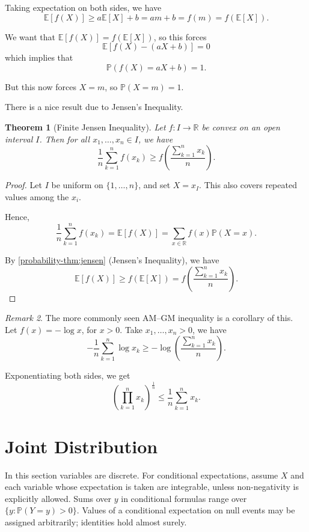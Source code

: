 \documentclass[11pt]{article}
\numberwithin{equation}{section}
\newtheorem{theorem}{Theorem}[section]
\theoremstyle{definition}
\theoremstyle{remark}
\newtheorem{remark}[theorem]{Remark}
\newcommand{\pqty}[1]{\left(#1\right)}
\newcommand{\bqty}[1]{\left[#1\right]}
\newcommand{\RR}{\mathbb R}
\newcommand{\Prob}{\mathbb P}
\newcommand{\Expt}{\mathbb E}
\begin{document}
Taking expectation on both sides, we have
\[
    \Expt\bqty{f\pqty{X}} \geq a \Expt\bqty{X} + b = am + b = f\pqty{m} = f\pqty{\Expt\bqty{X}}.
\]

We want that \(\Expt\bqty{f\pqty{X}} = f\pqty{\Expt\bqty{X}}\), so this forces
\[
    \Expt\bqty{f\pqty{X} - \pqty{aX + b}} = 0
\]
which implies that
\[
    \Prob\pqty{f\pqty{X} = aX + b} = 1.
\]

But this now forces \(X = m\), so \(\Prob\pqty{X = m} = 1\).

There is a nice result due to Jensen's Inequality.

\begin{theorem}[Finite Jensen Inequality]\label{probability-theorem-009}
    \label{probability-thm:am-gm}
    Let \(f:I\to\RR\) be convex on an open interval \(I\). Then for all \(x_1, \ldots, x_n \in I\), we have
    \[
        \frac{1}{n} \sum_{k = 1}^{n} f\pqty{x_k} \geq f\pqty{\frac{\sum_{k = 1}^{n} x_k}{n}}.
    \]
\end{theorem}

\begin{proof}\label{probability-proof-032}
    Let \(I\) be uniform on \(\{1,\ldots,n\}\), and set \(X=x_I\). This also covers repeated values among the \(x_i\).

    Hence,
    \[
        \frac{1}{n} \sum_{k = 1}^{n} f\pqty{x_k} = \Expt\bqty{f\pqty{X}} = \sum_{x \in \RR} f\pqty{x} \Prob\pqty{X = x}.
    \]

    By \autoref{probability-thm:jensen} (Jensen's Inequality), we have
    \[
        \Expt\bqty{f\pqty{X}} \geq f\pqty{\Expt\bqty{X}} = f\pqty{\frac{\sum_{k = 1}^{n} x_k}{n}}.
    \]
\end{proof}

\begin{remark}\label{probability-remark-005}
    The more commonly seen AM--GM inequality is a corollary of this. Let \(f\pqty{x} = - \log x\), for \(x > 0\). Take \(x_1, \ldots, x_n > 0\), we have
    \[
        - \frac{1}{n} \sum_{k = 1}^{n} \log x_k \geq - \log \pqty{\frac{\sum_{k = 1}^{n} x_k}{n}}.
    \]

    Exponentiating both sides, we get
    \[
        \pqty{\prod_{k = 1}^{n} x_k}^{\frac{1}{n}} \leq \frac{1}{n} \sum_{k = 1}^{n} x_k.
    \]
\end{remark}

\section{Joint Distribution}\label{probability-section-07}
In this section variables are discrete. For conditional expectations, assume
\(X\) and each variable whose expectation is taken are integrable, unless
non-negativity is explicitly allowed. Sums over \(y\) in conditional formulas
range over \(\{y:\Prob(Y=y)>0\}\). Values of a conditional expectation on
null events may be assigned arbitrarily; identities hold almost surely.
\end{document}
